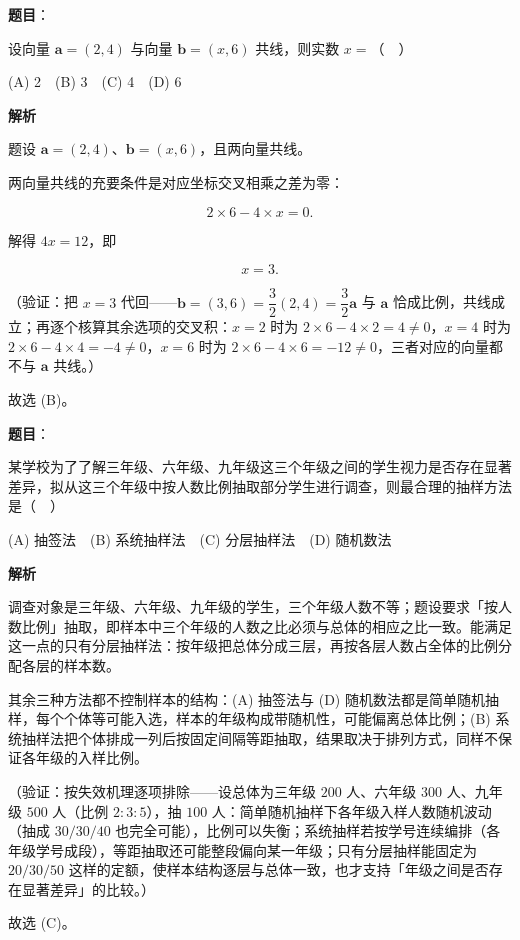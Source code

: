 \begin{answer}

\textbf{题目}：

设向量 \(\boldsymbol{a}=(2,4)\) 与向量 \(\boldsymbol{b}=(x,6)\) 共线，则实数 \(x=\)（　）

(A) 2　(B) 3　(C) 4　(D) 6

\textbf{解析}

题设 \(\boldsymbol{a}=(2,4)\)、\(\boldsymbol{b}=(x,6)\)，且两向量共线。

两向量共线的充要条件是对应坐标交叉相乘之差为零：

\nopagebreak[4]
\[
2\times6-4\times x=0.
\]

解得 \(4x=12\)，即

\nopagebreak[4]
\[
x=3.
\]

（验证：把 \(x=3\) 代回——\(\boldsymbol{b}=(3,6)=\dfrac32(2,4)=\dfrac32\boldsymbol{a}\) 与 \(\boldsymbol{a}\) 恰成比例，共线成立；再逐个核算其余选项的交叉积：\(x=2\) 时为 \(2\times6-4\times2=4\neq0\)，\(x=4\) 时为 \(2\times6-4\times4=-4\neq0\)，\(x=6\) 时为 \(2\times6-4\times6=-12\neq0\)，三者对应的向量都不与 \(\boldsymbol{a}\) 共线。）

故选 (B)。


\end{answer}
\begin{answer}

\textbf{题目}：

某学校为了了解三年级、六年级、九年级这三个年级之间的学生视力是否存在显著差异，拟从这三个年级中按人数比例抽取部分学生进行调查，则最合理的抽样方法是（　）

(A) 抽签法　(B) 系统抽样法　(C) 分层抽样法　(D) 随机数法

\textbf{解析}

调查对象是三年级、六年级、九年级的学生，三个年级人数不等；题设要求「按人数比例」抽取，即样本中三个年级的人数之比必须与总体的相应之比一致。能满足这一点的只有分层抽样法：按年级把总体分成三层，再按各层人数占全体的比例分配各层的样本数。

其余三种方法都不控制样本的结构：(A) 抽签法与 (D) 随机数法都是简单随机抽样，每个个体等可能入选，样本的年级构成带随机性，可能偏离总体比例；(B) 系统抽样法把个体排成一列后按固定间隔等距抽取，结果取决于排列方式，同样不保证各年级的入样比例。

（验证：按失效机理逐项排除——设总体为三年级 \(200\) 人、六年级 \(300\) 人、九年级 \(500\) 人（比例 \(2:3:5\)），抽 \(100\) 人：简单随机抽样下各年级入样人数随机波动（抽成 \(30/30/40\) 也完全可能），比例可以失衡；系统抽样若按学号连续编排（各年级学号成段），等距抽取还可能整段偏向某一年级；只有分层抽样能固定为 \(20/30/50\) 这样的定额，使样本结构逐层与总体一致，也才支持「年级之间是否存在显著差异」的比较。）

故选 (C)。


\end{answer}
